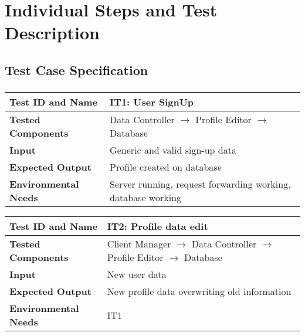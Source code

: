 \section{Individual Steps and Test Description}
\subsection{Test Case Specification}

\subsubsection{}

\begin{tabular}{l p{}}
    \hline
    \textbf{Test ID and Name} & \textbf{IT1: User SignUp}\\
    \hline
    \textbf{Tested Components} & Data Controller $\rightarrow$ Profile Editor $\rightarrow$ Database\\
    \hline
    \textbf{Input} & Generic and valid sign-up data\\
    \hline
    \textbf{Expected Output} & Profile created on database\\
    \hline
    \textbf{Environmental Needs} & Server running, request forwarding working, database working\\
    \hline
\end{tabular}

\vspace{2em}

\noindent\begin{tabular}{l p{}}
    \hline
    \textbf{Test ID and Name} & \textbf{IT2: Profile data edit}\\
    \hline
    \textbf{Tested Components} & Client Manager $\rightarrow$ Data Controller $\rightarrow$ Profile Editor $\rightarrow$ Database\\
    \hline
    \textbf{Input} & New user data\\
    \hline
    \textbf{Expected Output} & New profile data overwriting old information\\
    \hline
    \textbf{Environmental Needs} & IT1\\
    \hline
\end{tabular}

\subsubsection{}

